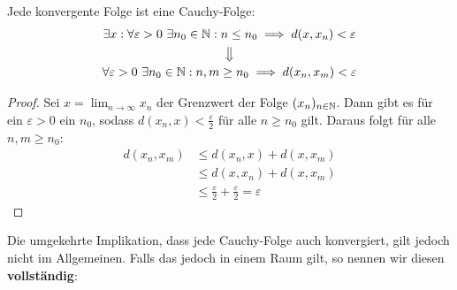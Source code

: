 \begin{lemma}{}{}
Jede konvergente Folge ist eine Cauchy-Folge:
\begin{gather*}
    \exists x: \forall \varepsilon >0\ \exists n_0 \in \mathbb{N}: n \leq n_0 \implies d(x, x_n) < \varepsilon \\ \big\Downarrow \\ \forall \varepsilon >0\ \exists n_0 \in \mathbb{N}: n,m \geq n_0 \implies d(x_n, x_m) < \varepsilon
\end{gather*}
\end{lemma}
\begin{proof}
Sei $x = \lim_{n \to \infty} x_n$ der Grenzwert der Folge $(x_n)_{n\in \mathbb{N}}$. Dann gibt es für ein $\varepsilon > 0$ ein $n_0$, sodass $d(x_n,x) < \frac{\varepsilon}{2}$ für alle $ n \geq n_0$ gilt. Daraus folgt für alle $n,m \geq n_0$:
\begin{align*}
    d(x_n,x_m) &\leq d(x_n,x) + d(x,x_m)\\
    &\leq d(x, x_n) + d(x, x_m)\\
    &\leq \frac{\varepsilon}{2} + \frac{\varepsilon}{2} = \varepsilon
\end{align*}
\end{proof}
Die umgekehrte Implikation, dass jede Cauchy-Folge auch konvergiert, gilt jedoch nicht im Allgemeinen. Falls das jedoch in einem Raum gilt, so nennen wir diesen \textbf{vollständig}:

